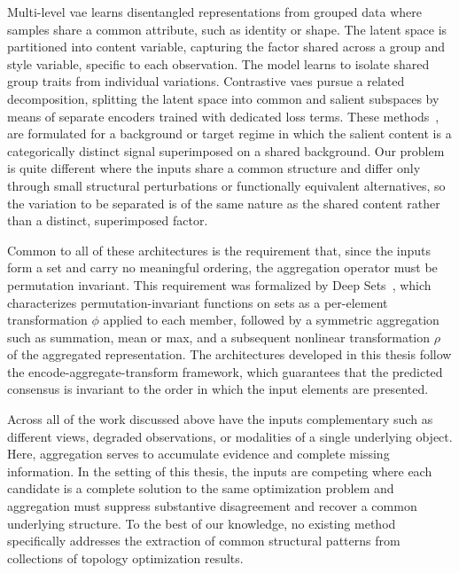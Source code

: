 \documentclass[
  numbers=noenddot,
  english,  %
  a4paper,  %
  twoside,  %
  bibliography=totoc,
  headsepline,
  cleardoublepage=empty,
  parskip=half,
  draft=false
]{scrbook}
\theoremstyle{break}
\begin{document}
Multi-level \gls{vae} \cite{c28} learns disentangled representations from grouped data where samples share a common attribute, such as identity or shape. The latent space is partitioned into content variable,
capturing the factor shared across a group and style variable, specific to each observation. The model learns to isolate shared group traits from individual variations. Contrastive \gls{vae}s pursue a related
decomposition, splitting the latent space into common and salient subspaces by means of separate encoders trained with dedicated loss terms. These methods~\cite{c30, c31}, are formulated for a background or target regime in which the salient content is a categorically distinct signal superimposed on a shared background. Our problem is quite different where the inputs share a common structure and differ only through small structural perturbations or functionally equivalent alternatives, so the variation to be separated is
of the same nature as the shared content rather than a distinct, superimposed factor.
 
Common to all of these architectures is the requirement that, since the inputs form a set and carry no meaningful ordering, the aggregation operator must be permutation invariant. This requirement was formalized by
Deep Sets~\cite{c29}, which characterizes permutation-invariant functions on sets as a per-element transformation $\phi$ applied to each member, followed by a symmetric aggregation such as summation, mean or max, and a subsequent nonlinear transformation $\rho$ of the aggregated representation. The architectures developed in this thesis follow the encode-aggregate-transform framework, which guarantees that the predicted
consensus is invariant to the order in which the input elements are presented.

Across all of the work discussed above have the inputs complementary such as different views, degraded observations, or modalities of a single underlying object. Here, aggregation serves to accumulate evidence and complete missing information. In the setting of this thesis, the inputs are competing where each candidate is a complete solution to the same optimization problem and aggregation must suppress substantive disagreement and recover a common underlying structure. To the best of our knowledge, no existing method specifically addresses the extraction of common structural patterns from collections of topology optimization results.


\end{document}

